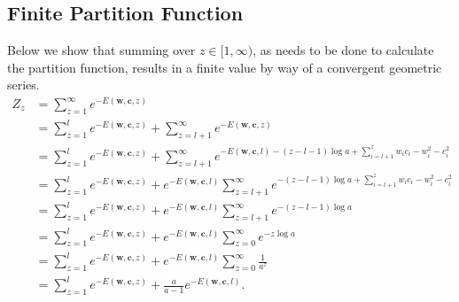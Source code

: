 \documentclass{article} %
\begin{document}
\subsection*{Finite Partition Function}
Below we show that summing over $z \in [1, \infty)$, as needs to be done to calculate the partition function, results in a finite value by way of a convergent geometric series.
\begin{equation*}\begin{split}\label{z_finite_full}
Z_{z} &= \sum_{z=1}^{\infty} e^{-E(\mathbf{w}, \mathbf{c}, z)} \\ &= \sum_{z=1}^{l} e^{-E(\mathbf{w}, \mathbf{c}, z)} + \sum_{z=l+1}^{\infty} e^{-E(\mathbf{w}, \mathbf{c}, z)} \\ &= \sum_{z=1}^{l} e^{-E(\mathbf{w}, \mathbf{c}, z)} + \sum_{z=l+1}^{\infty} e^{-E(\mathbf{w}, \mathbf{c}, l) - (z-l-1)\log a + \sum_{i=l+1}^{z} w_{i}c_{i} - w_{i}^{2} - c_{i}^{2}} \\ &= \sum_{z=1}^{l} e^{-E(\mathbf{w}, \mathbf{c}, z)} + e^{-E(\mathbf{w}, \mathbf{c}, l)} \sum_{z=l+1}^{\infty} e^{  -(z-l-1)\log a + \sum_{i=l+1}^{z} w_{i}c_{i} - w_{i}^{2} - c_{i}^{2} }   \\ &= \sum_{z=1}^{l} e^{-E(\mathbf{w}, \mathbf{c}, z)} + e^{-E(\mathbf{w}, \mathbf{c}, l)} \sum_{z=l+1}^{\infty} e^{  -(z-l-1) \log a } \\ &= \sum_{z=1}^{l} e^{-E(\mathbf{w}, \mathbf{c}, z)} + e^{-E(\mathbf{w}, \mathbf{c}, l)} \sum_{z=0}^{\infty} e^{  -z \log a } \\ &= \sum_{z=1}^{l} e^{-E(\mathbf{w}, \mathbf{c}, z)} + e^{-E(\mathbf{w}, \mathbf{c}, l)} \sum_{z=0}^{\infty} \frac{1}{a^{  z }} \\ &= \sum_{z=1}^{l} e^{-E(\mathbf{w}, \mathbf{c}, z)} + \frac{a}{a-1}e^{-E(\mathbf{w}, \mathbf{c}, l)}.
\end{split}
\end{equation*} 
\end{document}
